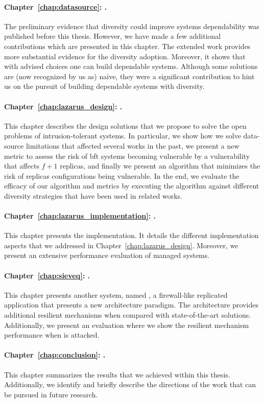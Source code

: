 \paragraph{Chapter~\ref{chap:datasource}: .}
The preliminary evidence that diversity could improve systems dependability was published before this thesis. 
However, we have made a few additional contributions which are presented in this chapter. 
The extended work provides more substantial evidence for the diversity adoption.
Moreover, it shows that with advised choices one can build dependable systems.
Although some solutions are (now recognized by us as) naive, they were a significant contribution to hint us on the pursuit of building dependable systems with diversity.


\paragraph{Chapter~\ref{chap:lazarus_design}: .}
This chapter describes the design solutions that we propose to solve the open problems of intrusion-tolerant systems.
In particular, we show how we solve data-source limitations that affected several works in the past, we present a new metric to assess the risk of \gls{bft} systems becoming vulnerable by a  vulnerability that affects $f+1$ replicas, and finally we present an algorithm that minimizes the risk of replicas configurations being vulnerable.
In the end, we evaluate the efficacy of our algorithm and metrics by executing the algorithm against different diversity strategies that have been used in related works.


\paragraph{Chapter~\ref{chap:lazarus_implementation}: .}
This chapter presents the \system implementation. 
It details the different implementation aspects that we addressed in Chapter~\ref{chap:lazarus_design}. 
Moreover, we present an extensive performance evaluation of \system managed systems.


\paragraph{Chapter~\ref{chap:sieveq}: .}
This chapter presents another system, named \sieveq, a firewall-like replicated application that presents a new architecture paradigm.
The \sieveq architecture provides additional resilient mechanisms when compared with state-of-the-art solutions.
Additionally, we present an evaluation where we show the resilient mechanism performance when \sieveq is attacked.



\paragraph{Chapter~\ref{chap:conclusion}: .}
This chapter summarizes the results that we achieved within this thesis.
Additionally, we identify and briefly describe the directions of the work that can be pursued in future research.   

